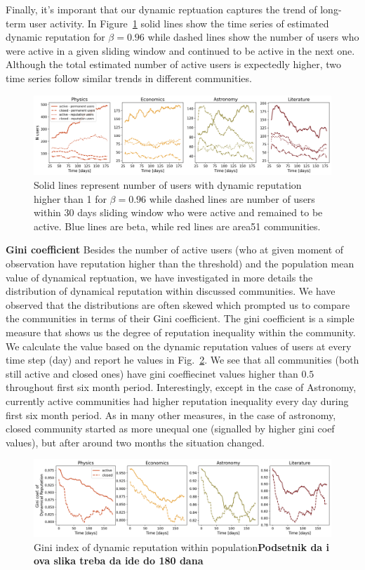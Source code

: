 Finally, it's imporant that our dynamic reptuation captures the trend of long-term user activity. In Figure~\ref{fig:active-users} solid lines show the time series of estimated dynamic reputation for $\beta = 0.96$ while dashed lines show the number of users who were active in a given sliding window and continued to be active in the next one. Although the total estimated number of active users is expectedly higher, two time series follow similar trends in different communities.

\begin{figure}[h!]
	\centering
	\includegraphics[width=1\linewidth]{Figures/FigA4.png}
	\caption{Solid lines represent number of users with dynamic reputation higher than 1 for $\beta=0.96$ while dashed lines are number of users within 30 days sliding window who were active and remained to be active. Blue lines are beta, while red lines are area51 communities.}
	\label{fig:active-users}
\end{figure}
\clearpage


\textbf{Gini coefficient}
Besides the number of active users (who at given moment of observation have reputation higher than the threshold) and the population mean value of dynamical reptuation, we have investigated in more details the distribution of dynamical reputation within discussed communities. We have observed that the distributions are often skewed which prompted us to compare the communities in terms of their Gini coefficient. The gini coefficient is a simple measure that shows us the degree of reputation inequality within the community. We calculate the value based on the dynamic reputation values of users at every time step (day) and report he values in Fig.~\ref{fig:dynrep-gini}. We see that all communities (both still active and closed ones) have gini coeffiecinet values higher than $0.5$ throughout first six month period. Interestingly, except in the case of Astronomy, currently active communities had higher reputation inequality every day during first six month period. As in many other measures, in the case of astronomy, closed community started as more unequal one (signalled by higher gini coef values), but after around two months the situation changed. 
\begin{figure}[h!]
	\centering
	\includegraphics[width=1\linewidth]{Figures/FigA5.png}
	\caption{Gini index of dynamic reputation within population\textbf{Podsetnik da i ova slika treba da ide do 180 dana}}
	\label{fig:dynrep-gini}
\end{figure}

